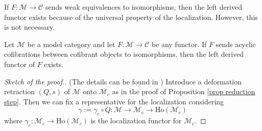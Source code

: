 \begin{rmk}
If $F \colon \mathcal M \to \mathcal C$ sends weak equivalences to isomorphisms, then the left derived functor exists because of the universal property of the localization. However, this is not necessary. %
\end{rmk}

\begin{thm} \label{thm existence derived functor}
Let $\mathcal M$ be a model category and let $F \colon \mathcal M \to \mathcal C$ be any functor. If $F$ sends acyclic cofibrations between cofibrant objects to isomorphisms, then the left derived functor of $F$ exists.
\end{thm}

\begin{proof}[Sketch of the proof.] (The details can be found in \cite[Theorem 2.2.8]{riehl}) Introduce a deformation retraction $(Q,s)$ of $\mathcal M$ onto $\mathcal M_c$ as in the proof of Proposition \ref{prop reduction step}. Then we can fix a representative for the localization considering
\[
\gamma := \gamma_c \circ Q \colon \mathcal M \to \mathcal M_c \to \mathrm{Ho}(\mathcal M_c)
\]
where $\gamma_c \colon \mathcal M_c \to \mathrm{Ho}(\mathcal M_c)$ is the localization functor for $\mathcal M_c$.


\end{proof}
